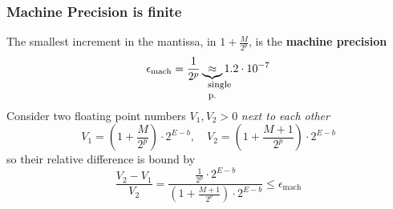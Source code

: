 \subsubsection{Machine Precision is finite}
The smallest increment in the mantissa, in $1 + \frac{M}{2^p}$, is the \textbf{machine precision}
\begin{equation}
    \epsilon_{\text{mach}} = \frac{1}{2^p} \explain{\approx}{single p.} 1.2 \cdot 10^{-7}
\end{equation}
Consider two floating point numbers $V_1,V_2>0$ \textit{next to each other}
\begin{equation}
    V_1 = \left(1 + \frac{M}{2^p}\right) \cdot 2^{E - b}, \quad V_2 = \left(1 + \frac{M + 1}{2^p}\right) \cdot 2^{E - b}
\end{equation}
so their relative difference is bound by
\begin{equation}
    \frac{V_2 - V_1}{V_2} = \frac{\frac{1}{2^p} \cdot 2^{E - b}}{\left(1 + \frac{M + 1}{2^p}\right) \cdot 2^{E - b}} \leq \epsilon_{\text{mach}}
\end{equation}

